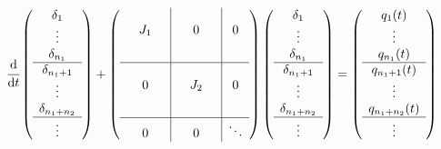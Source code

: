 \documentclass[accepted]{uai2023}
\newcommand{\dt}[1]{\cfrac{\mathrm{d} #1}{\mathrm{d} t}}
\begin{document}
        \begin{equation}
            \dt{} 
            \left(\begin{array}{c}
                \delta_{1} \\ \vdots \\ \delta_{n_1} \\ 
                \hline
                \delta_{n_1 + 1} \\ \vdots \\ \delta_{n_1 + n_2} \\ 
                \hline
                \vdots 
            \end{array}\right)
            +
            \left(\begin{array}{c|c|c}
                \begin{matrix} && \\ &J_1& \\ && \end{matrix} & 0 & 0 \\[1.9em]
                \hline
                0 & \begin{matrix} && \\ &J_2& \\ && \end{matrix} & 0 \\[1.9em]
                \hline
                0 & 0 & \ddots 
            \end{array}\right)
            \left(\begin{array}{c}
                \delta_{1} \\ \vdots \\ \delta_{n_1} \\ 
                \hline
                \delta_{n_1 + 1} \\ \vdots \\ \delta_{n_1 + n_2} \\ 
                \hline
                \vdots 
            \end{array}\right)
            =
            \left(\begin{array}{c}
                q_{1}(t)\\\vdots\\ q_{n_1}(t) \\ 
                \hline
                q_{n_1 + 1}(t) \\ \vdots \\ q_{n_1 + n_2}(t) \\ 
                \hline
                \vdots 
            \end{array}\right)
        \end{equation}
    \endgroup
\end{document}
